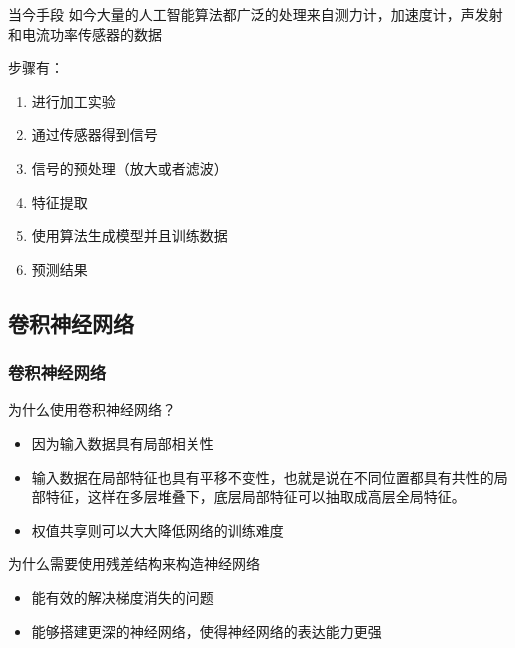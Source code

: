 \documentclass[12pt,aspectratio=169]{beamer}
\begin{document}
	\begin{frame}{当今手段}
		如今大量的人工智能算法都广泛的处理来自测力计，加速度计，声发射和电流功率传感器的数据\cite{cho1999state}
		
		步骤有：
		
		\begin{enumerate}
			\item 进行加工实验
			\item 通过传感器得到信号
			\item 信号的预处理（放大或者滤波）
			\item 特征提取
			\item 使用算法生成模型并且训练数据
			\item 预测结果
		\end{enumerate}
		
		
%		
	\end{frame}
	
	\subsection{卷积神经网络}
	
	\begin{frame}
		\frametitle{卷积神经网络}
		\begin{block}{为什么使用卷积神经网络？}
			\begin{itemize}
				\item 因为输入数据具有局部相关性
				\item 输入数据在局部特征也具有平移不变性，也就是说在不同位置都具有共性的局部特征，这样在多层堆叠下，底层局部特征可以抽取成高层全局特征。
				\item 权值共享则可以大大降低网络的训练难度
				
			\end{itemize}
			
		\end{block}
		\begin{block}{为什么需要使用残差结构来构造神经网络}
			\begin{itemize}
				\item 能有效的解决梯度消失的问题
				\item 能够搭建更深的神经网络，使得神经网络的表达能力更强
			\end{itemize}
		\end{block}
	\end{frame}
	
\end{document}
